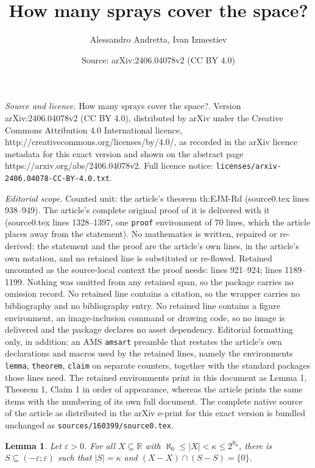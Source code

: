 \documentclass[10pt,a4paper]{amsart}
\title{How many sprays cover the space?}
\author{Alessandro Andretta, Ivan Izmestiev}
\date{Source: arXiv:2406.04078v2 (CC BY 4.0)}
\newtheorem{lemma}{Lemma}
\newcommand{\R}{\mathbb{R}}	%
\newcommand{\card}[1]{\mathopen | #1 \mathclose |}		%
\newcommand{\set}[1]{\mathopen \{ {#1} \mathclose \}} %
\begin{document}
\maketitle

\noindent\emph{Source and licence.} How many sprays cover the space?. Version arXiv:2406.04078v2 (CC BY 4.0), distributed by arXiv under the Creative Commons Attribution 4.0 International licence, http://creativecommons.org/licenses/by/4.0/, as recorded in the arXiv licence metadata for this exact version and shown on the abstract page https://arxiv.org/abs/2406.04078v2. Full licence notice: \texttt{licenses/arxiv-2406.04078-CC-BY-4.0.txt}.\par\smallskip

\noindent\textit{Editorial scope.} Counted unit: the article's theorem th:EJM-Rd (source0.tex lines 938--949). The article's complete original proof of it is delivered with it (source0.tex lines 1328--1397, one \texttt{proof} environment of 70 lines, which the article places away from the statement). No mathematics is written, repaired or re-derived: the statement and the proof are the article's own lines, in the article's own notation, and no retained line is substituted or re-flowed.  Retained uncounted as the source-local context the proof needs: lines 921--924; lines 1189--1199.  Nothing was omitted from any retained span, so the package carries no omission record.  No retained line contains a citation, so the wrapper carries no bibliography and no bibliography entry.  No retained line contains a figure environment, an image-inclusion command or drawing code, so no image is delivered and the package declares no asset dependency.  Editorial formatting only, in addition: an AMS \texttt{amsart} preamble that restates the article's own declarations and macros used by the retained lines, namely the environments \texttt{lemma}, \texttt{theorem}, \texttt{claim} on separate counters, together with the standard packages those lines need.  The retained environments print in this document as Lemma 1, Theorem 1, Claim 1 in order of appearance, whereas the article prints the same items with the numbering of its own full document.  The complete native source of the article as distributed in the arXiv e-print for this exact version is bundled unchanged as \texttt{sources/160399/source0.tex}.
\begin{lemma}\label{lem:setofdifferenceinabeliangroup}
Let \( \varepsilon > 0 \).
For all \( X \subseteq \R \) with \( \aleph_0 \leq \card{X} < \kappa \leq 2^{\aleph_0} \), there is \( S \subseteq ( - \varepsilon ; \varepsilon ) \) such that \( \card{S} = \kappa \) and \( ( X - X ) \cap ( S - S ) = \set{ 0 } \).
\end{lemma}
\end{document}
